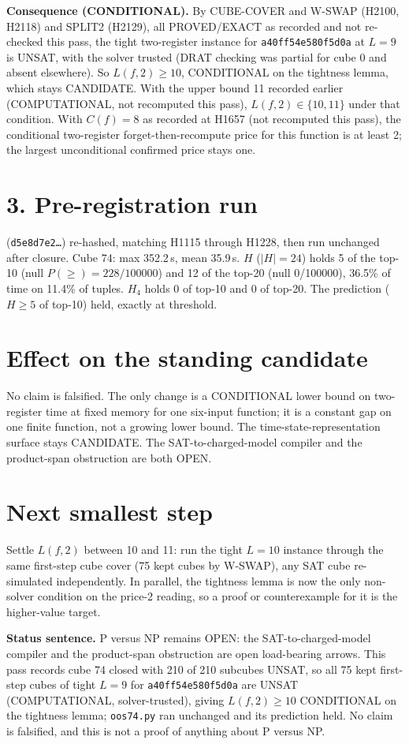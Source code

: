 \documentclass[11pt]{article}
\begin{document}
\textbf{Consequence (CONDITIONAL).} By CUBE-COVER and W-SWAP (H2100, H2118) and SPLIT2 (H2129), all PROVED/EXACT as recorded and not re-checked this pass, the tight two-register instance for \texttt{a40ff54e580f5d0a} at $L=9$ is UNSAT, with the solver trusted (DRAT checking was partial for cube 0 and absent elsewhere). So $L(f,2)\ge 10$, CONDITIONAL on the tightness lemma, which stays CANDIDATE. With the upper bound 11 recorded earlier (COMPUTATIONAL, not recomputed this pass), $L(f,2)\in\{10,11\}$ under that condition. With $C(f)=8$ as recorded at H1657 (not recomputed this pass), the conditional two-register forget-then-recompute price for this function is at least 2; the largest unconditional confirmed price stays one.

\section*{3. Pre-registration run}
 (\texttt{d5e8d7e2\ldots}) re-hashed, matching H1115 through H1228, then run unchanged after closure. Cube 74: max 352.2\,s, mean 35.9\,s. $H$ ($|H|=24$) holds 5 of the top-10 (null $P(\ge)=228/100000$) and 12 of the top-20 (null 0/100000), 36.5\% of time on 11.4\% of tuples. $H_4$ holds 0 of top-10 and 0 of top-20. The prediction ($H\ge5$ of top-10) held, exactly at threshold.

\section*{Effect on the standing candidate}
No claim is falsified. The only change is a CONDITIONAL lower bound on two-register time at fixed memory for one six-input function; it is a constant gap on one finite function, not a growing lower bound. The time-state-representation surface stays CANDIDATE. The SAT-to-charged-model compiler and the product-span obstruction are both OPEN.

\section*{Next smallest step}
Settle $L(f,2)$ between 10 and 11: run the tight $L=10$ instance through the same first-step cube cover (75 kept cubes by W-SWAP), any SAT cube re-simulated independently. In parallel, the tightness lemma is now the only non-solver condition on the price-2 reading, so a proof or counterexample for it is the higher-value target.

\bigskip
\noindent\textbf{Status sentence.} P versus NP remains OPEN: the SAT-to-charged-model compiler and the product-span obstruction are open load-bearing arrows. This pass records cube 74 closed with 210 of 210 subcubes UNSAT, so all 75 kept first-step cubes of tight $L=9$ for \texttt{a40ff54e580f5d0a} are UNSAT (COMPUTATIONAL, solver-trusted), giving $L(f,2)\ge10$ CONDITIONAL on the tightness lemma; \texttt{oos74.py} ran unchanged and its prediction held. No claim is falsified, and this is not a proof of anything about P versus NP.
\end{document}
